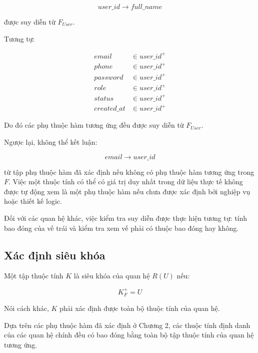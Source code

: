 \[
user\_id \rightarrow full\_name
\]

được suy diễn từ $F_{User}$.

Tương tự:

\[
\begin{aligned}
	email &\in user\_id^+\\
	phone &\in user\_id^+\\
	password &\in user\_id^+\\
	role &\in user\_id^+\\
	status &\in user\_id^+\\
	created\_at &\in user\_id^+
\end{aligned}
\]

Do đó các phụ thuộc hàm tương ứng đều được suy diễn từ $F_{User}$.

Ngược lại, không thể kết luận:

\[
email \rightarrow user\_id
\]

từ tập phụ thuộc hàm đã xác định nếu không có phụ thuộc hàm tương ứng trong
$F$. Việc một thuộc tính có thể có giá trị duy nhất trong dữ liệu thực tế
không được tự động xem là một phụ thuộc hàm nếu chưa được xác định bởi
nghiệp vụ hoặc thiết kế logic.

Đối với các quan hệ khác, việc kiểm tra suy diễn được thực hiện tương tự:
tính bao đóng của vế trái và kiểm tra xem vế phải có thuộc bao đóng hay không.

\subsection{Xác định siêu khóa}

Một tập thuộc tính $K$ là siêu khóa của quan hệ $R(U)$ nếu:

\[
K^+_F = U
\]

Nói cách khác, $K$ phải xác định được toàn bộ thuộc tính của quan hệ.

Dựa trên các phụ thuộc hàm đã xác định ở Chương 2, các thuộc tính định danh
của các quan hệ chính đều có bao đóng bằng toàn bộ tập thuộc tính của
quan hệ tương ứng.

